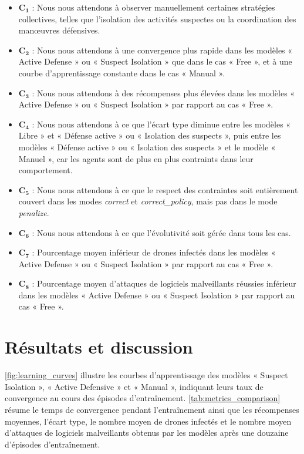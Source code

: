 \begin{itemize}
  \item $\mathbf{C_1}$ : Nous nous attendons à observer manuellement certaines stratégies collectives, telles que l'isolation des activités suspectes ou la coordination des manœuvres défensives.
  \item $\mathbf{C_2}$ : Nous nous attendons à une convergence plus rapide dans les modèles « Active Defense » ou « Suspect Isolation » que dans le cas « Free », et à une courbe d'apprentissage constante dans le cas « Manual ».
  \item $\mathbf{C_3}$ : Nous nous attendons à des récompenses plus élevées dans les modèles « Active Defense » ou « Suspect Isolation » par rapport au cas « Free ».
  \item $\mathbf{C_{4}}$ : Nous nous attendons à ce que l'écart type diminue entre les modèles « Libre » et « Défense active » ou « Isolation des suspects », puis entre les modèles « Défense active » ou « Isolation des suspects » et le modèle « Manuel », car les agents sont de plus en plus contraints dans leur comportement.
  \item $\mathbf{C_{5}}$ : Nous nous attendons à ce que le respect des contraintes soit entièrement couvert dans les modes \textit{correct} et \textit{correct\_policy}, mais pas dans le mode \textit{penalize}.
  \item $\mathbf{C_{6}}$ : Nous nous attendons à ce que l'évolutivité soit gérée dans tous les cas.
  \item $\mathbf{C_7}$ : Pourcentage moyen inférieur de drones infectés dans les modèles « Active Defense » ou « Suspect Isolation » par rapport au cas « Free ».
  \item $\mathbf{C_8}$ : Pourcentage moyen d'attaques de logiciels malveillants réussies inférieur dans les modèles « Active Defense » ou « Suspect Isolation » par rapport au cas « Free ».

\end{itemize}

\section{Résultats et discussion}\label{sec:results_and_discussion}

\autoref{fig:learning_curves} illustre les courbes d'apprentissage des modèles « Suspect Isolation », « Active Defensive » et « Manual », indiquant leurs taux de convergence au cours des épisodes d'entraînement.
\autoref{tab:metrics_comparison} résume le temps de convergence pendant l'entraînement ainsi que les récompenses moyennes, l'écart type, le nombre moyen de drones infectés et le nombre moyen d'attaques de logiciels malveillants obtenus par les modèles après une douzaine d'épisodes d'entraînement.


